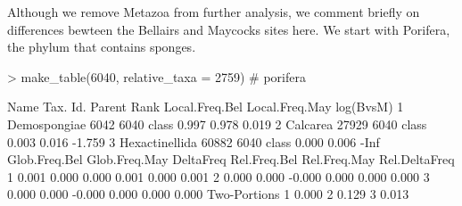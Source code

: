 \documentclass{article}
\begin{document}
Although we remove Metazoa from further analysis,
we comment briefly on differences bewteen the Bellairs and Maycocks sites here.
We start with Porifera, the phylum  that contains sponges.
\begin{Schunk}
\begin{Sinput}
> make_table(6040, relative_taxa = 2759) # porifera
\end{Sinput}
\begin{Soutput}
            Name Tax. Id. Parent  Rank Local.Freq.Bel Local.Freq.May log(BvsM)
1   Demospongiae     6042   6040 class          0.997          0.978     0.019
2       Calcarea    27929   6040 class          0.003          0.016    -1.759
3 Hexactinellida    60882   6040 class          0.000          0.006      -Inf
  Glob.Freq.Bel Glob.Freq.May DeltaFreq Rel.Freq.Bel Rel.Freq.May Rel.DeltaFreq
1         0.001         0.000     0.000        0.001        0.000         0.001
2         0.000         0.000    -0.000        0.000        0.000         0.000
3         0.000         0.000    -0.000        0.000        0.000         0.000
  Two-Portions
1        0.000
2        0.129
3        0.013
\end{Soutput}
\end{Schunk}
\end{document}
